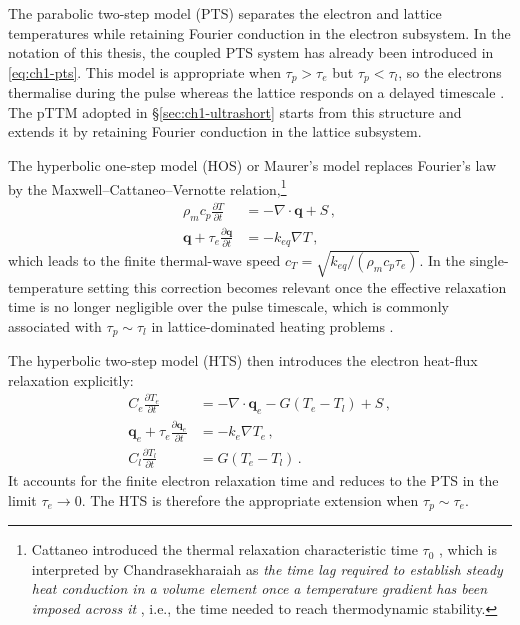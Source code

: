   The parabolic two-step model (PTS) separates the electron and lattice temperatures while retaining Fourier conduction in the electron subsystem. In the notation of this thesis, the coupled PTS system has already been introduced in \eqref{eq:ch1-pts}. This model is appropriate when \(\tau_p > \tau_e\) but \(\tau_p < \tau_l\), so the electrons thermalise during the pulse whereas the lattice responds on a delayed timescale \cite{Anisimov_1974,Qiu_1992}. The pTTM adopted in \S\ref{sec:ch1-ultrashort} starts from this structure and extends it by retaining Fourier conduction in the lattice subsystem.

  The hyperbolic one-step model (HOS) or Maurer's model \cite{Maurer_1969} replaces Fourier's law by the Maxwell--Cattaneo--Vernotte relation,\cite{Vernotte_1958,Majchrzak_2012}\footnote{
    Cattaneo introduced the thermal relaxation characteristic time $\tau_0$ \cite{Cattaneo_1948}, which is interpreted by Chandrasekharaiah as \emph{the
      time lag required to establish steady heat conduction in a volume element once a
      temperature gradient has been imposed across it} \cite{Chandrasekharaiah_1998},
    i.e., the time needed to reach thermodynamic stability.
  }
  \begin{align*}
    \rho_m c_p \frac{\partial T}{\partial t}                   & = -\nabla \cdot \mathbf{q} + S \, , \\
    \mathbf{q} + \tau_e \frac{\partial \mathbf{q}}{\partial t} & = -k_{eq}\nabla T \, ,
  \end{align*}
  which leads to the finite thermal-wave speed \(c_T = \sqrt{k_{eq}/(\rho_m c_p \tau_e)}\). In the single-temperature setting this correction becomes relevant once the effective relaxation time is no longer negligible over the pulse timescale, which is commonly associated with \(\tau_p \sim \tau_l\) in lattice-dominated heating problems \cite{Majchrzak_2012, Mochnacki_2013}.

  The hyperbolic two-step model (HTS) then introduces the electron heat-flux relaxation explicitly:\cite{Qiu_1993}
  \begin{align*}
    C_e \frac{\partial T_e}{\partial t}                            & = -\nabla \cdot \mathbf{q}_e - G(T_e - T_l) + S \, , \\
    \mathbf{q}_e + \tau_e \frac{\partial \mathbf{q}_e}{\partial t} & = -k_e \nabla T_e \, ,                               \\
    C_l \frac{\partial T_l}{\partial t}                            & = G(T_e - T_l) \, .
  \end{align*}
  It accounts for the finite electron relaxation time and reduces to the PTS in the limit \(\tau_e \to 0\).
  The HTS is therefore the appropriate extension when \(\tau_p \sim \tau_e\).


